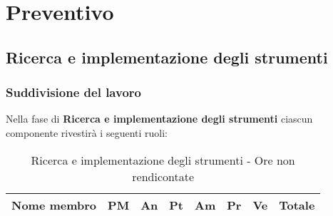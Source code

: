 %
%


\section{Preventivo} %
\label{sec:preventivo}
	\subsection{Ricerca e implementazione degli strumenti} %
	\label{sub:ricerca_e_implementazione_degli_strumenti}
		\subsubsection{Suddivisione del lavoro} %
		\label{ssub:suddivisione_del_lavoro}
		Nella fase di \textbf{Ricerca e implementazione degli strumenti} ciascun componente rivestirà i seguenti ruoli: \\
			\begin{table}[!h]
				\begin{center}
					\begin{tabularx}{0.9\textwidth}{|l|l|l|l|l|l|l|X|}
						\hline
						\textbf{Nome membro} & \textbf{PM} & \textbf{An} & \textbf{Pt} & \textbf{Am} & \textbf{Pr} & \textbf{Ve} & \textbf{Totale} \\
						\hline
						
						\hline		
					\end{tabularx}
				\end{center}
			\caption{Ricerca e implementazione degli strumenti - Ore non rendicontate}
			\end{table}
		
